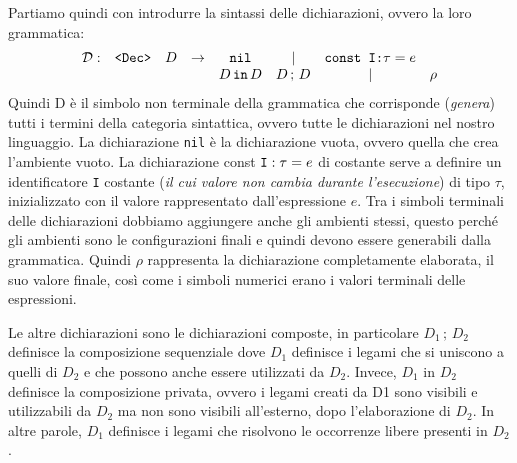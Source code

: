 \documentclass[oneside,a4paper,11pt]{book}
\theoremstyle{italicstyle}
\theoremstyle{normStyle}
\begin{document}
Partiamo quindi con introdurre la sintassi delle dichiarazioni, ovvero la loro
grammatica:
\[
  \begin{matrix}
    \mathcal{D}: & \verb|<Dec>| & D & \rightarrow & \verb|nil| & | &
    \verb|const I:| \tau = e \\
    &  &  & &   D\,\verb|in|\,D & D\,;\,D & | & \rho
  \end{matrix}
\]
Quindi D è il simbolo non terminale della grammatica che corrisponde (\textit{genera}) tutti
i termini della categoria sintattica, ovvero tutte le dichiarazioni nel nostro
linguaggio. La dichiarazione \verb|nil| è la dichiarazione vuota, ovvero quella che crea
l’ambiente vuoto. La dichiarazione const $\verb|I|:\tau=e$ di costante serve a definire un
identificatore \verb|I| costante (\textit{il cui valore non cambia durante l’esecuzione})
di tipo $\tau$, inizializzato con il valore rappresentato
dall'espressione $e$. Tra i simboli terminali delle dichiarazioni dobbiamo
aggiungere anche gli ambienti stessi, questo perché gli ambienti sono le
configurazioni finali e quindi devono essere generabili dalla grammatica. Quindi $\rho$
rappresenta la dichiarazione completamente elaborata, il suo valore finale, così come i
simboli numerici erano i valori terminali delle espressioni.

Le altre dichiarazioni sono le dichiarazioni composte, in
particolare $D_1\,;\,D_2$ definisce la composizione sequenziale dove $D_1$
definisce i legami che si uniscono a quelli di $D_2$ e che possono anche
essere utilizzati da $D_2$. Invece, $D_1$ in $D_2$ definisce la composizione
privata, ovvero i legami creati da D1 sono visibili e utilizzabili da $D_2$
ma non sono visibili all’esterno, dopo l’elaborazione di $D_2$. In altre parole,
$D_1$ definisce i legami che risolvono le occorrenze libere presenti in $D_2$.
\end{document}
